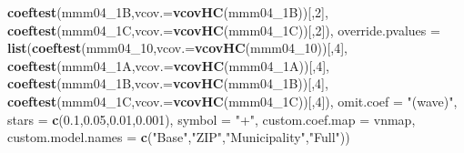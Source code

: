 \documentclass[
]{article}
\newenvironment{Shaded}{\begin{snugshade}}{\end{snugshade}}
\newcommand{\DataTypeTok}[1]{\textcolor[rgb]{0.13,0.29,0.53}{#1}}
\newcommand{\DecValTok}[1]{\textcolor[rgb]{0.00,0.00,0.81}{#1}}
\newcommand{\FloatTok}[1]{\textcolor[rgb]{0.00,0.00,0.81}{#1}}
\newcommand{\KeywordTok}[1]{\textcolor[rgb]{0.13,0.29,0.53}{\textbf{#1}}}
\newcommand{\NormalTok}[1]{#1}
\newcommand{\StringTok}[1]{\textcolor[rgb]{0.31,0.60,0.02}{#1}}
\begin{document}
\begin{Shaded}
\begin{Highlighting}[]
                             \KeywordTok{coeftest}\NormalTok{(mmm04_1B,}\DataTypeTok{vcov.=}\KeywordTok{vcovHC}\NormalTok{(mmm04_1B))[,}\DecValTok{2}\NormalTok{],}
                             \KeywordTok{coeftest}\NormalTok{(mmm04_1C,}\DataTypeTok{vcov.=}\KeywordTok{vcovHC}\NormalTok{(mmm04_1C))[,}\DecValTok{2}\NormalTok{]),}
          \DataTypeTok{override.pvalues =} \KeywordTok{list}\NormalTok{(}\KeywordTok{coeftest}\NormalTok{(mmm04_}\DecValTok{10}\NormalTok{,}\DataTypeTok{vcov.=}\KeywordTok{vcovHC}\NormalTok{(mmm04_}\DecValTok{10}\NormalTok{))[,}\DecValTok{4}\NormalTok{],}
                                  \KeywordTok{coeftest}\NormalTok{(mmm04_1A,}\DataTypeTok{vcov.=}\KeywordTok{vcovHC}\NormalTok{(mmm04_1A))[,}\DecValTok{4}\NormalTok{],}
                                  \KeywordTok{coeftest}\NormalTok{(mmm04_1B,}\DataTypeTok{vcov.=}\KeywordTok{vcovHC}\NormalTok{(mmm04_1B))[,}\DecValTok{4}\NormalTok{],}
                                  \KeywordTok{coeftest}\NormalTok{(mmm04_1C,}\DataTypeTok{vcov.=}\KeywordTok{vcovHC}\NormalTok{(mmm04_1C))[,}\DecValTok{4}\NormalTok{]),}
          \DataTypeTok{omit.coef =} \StringTok{"(wave)"}\NormalTok{, }\DataTypeTok{stars =} \KeywordTok{c}\NormalTok{(}\FloatTok{0.1}\NormalTok{,}\FloatTok{0.05}\NormalTok{,}\FloatTok{0.01}\NormalTok{,}\FloatTok{0.001}\NormalTok{), }\DataTypeTok{symbol =} \StringTok{"+"}\NormalTok{,}
          \DataTypeTok{custom.coef.map =}\NormalTok{ vnmap, }
          \DataTypeTok{custom.model.names =} \KeywordTok{c}\NormalTok{(}\StringTok{"Base"}\NormalTok{,}\StringTok{"ZIP"}\NormalTok{,}\StringTok{"Municipality"}\NormalTok{,}\StringTok{"Full"}\NormalTok{))}
\end{Highlighting}
\end{Shaded}
\end{document}
